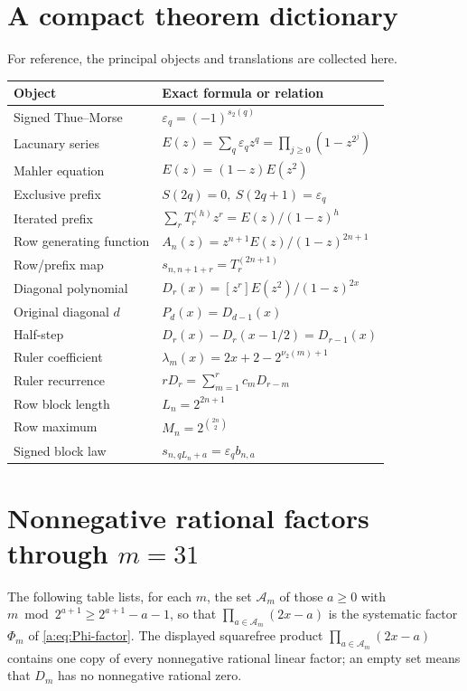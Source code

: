 \documentclass[11pt,a4paper,oneside,openany]{book}
\numberwithin{equation}{chapter}
\theoremstyle{definition}
\theoremstyle{remark}
\newcommand{\eps}{\varepsilon}
\newcommand{\wt}{s_2}
\newcommand{\nuTwo}{\nu_2}
\newcommand{\Diag}{D}
\newcommand{\Prefix}{T}
\begin{document}
\chapter{A compact theorem dictionary}\label{app:dictionary}

For reference, the principal objects and translations are collected here.

\begin{center}
\begin{tabularx}{\textwidth}{@{}p{}X@{}}
\toprule
Object & Exact formula or relation \\
\midrule
Signed Thue--Morse & \(\eps_q=(-1)^{\wt(q)}\) \\
Lacunary series & \(E(z)=\sum_q\eps_qz^q=\prod_{j\ge0}(1-z^{2^j})\) \\
Mahler equation & \(E(z)=(1-z)E(z^2)\) \\
Exclusive prefix & \(S(2q)=0,\ S(2q+1)=\eps_q\) \\
Iterated prefix & \(\sum_r\Prefix_r^{(h)}z^r=E(z)/(1-z)^h\) \\
Row generating function & \(A_n(z)=z^{n+1}E(z)/(1-z)^{2n+1}\) \\
Row/prefix map & \(s_{n,n+1+r}=\Prefix_r^{(2n+1)}\) \\
Diagonal polynomial & \(\Diag_r(x)=[z^r]E(z^2)/(1-z)^{2x}\) \\
Original diagonal \(d\) & \(P_d(x)=\Diag_{d-1}(x)\) \\
Half-step & \(\Diag_r(x)-\Diag_r(x-1/2)=\Diag_{r-1}(x)\) \\
Ruler coefficient & \(\lambda_m(x)=2x+2-2^{\nuTwo(m)+1}\) \\
Ruler recurrence & \(r\Diag_r=\sum_{m=1}^rc_m\Diag_{r-m}\) \\
Row block length & \(L_n=2^{2n+1}\) \\
Row maximum & \(M_n=2^{\binom{2n}{2}}\) \\
Signed block law & \(s_{n,qL_n+a}=\eps_qb_{n,a}\) \\
\bottomrule
\end{tabularx}
\end{center}
\chapter{Nonnegative rational factors through \texorpdfstring{$m=31$}{m=31}}
\label{b:app:factor-table}

The following table lists, for each $m$, the set $\mathcal A_m$ of those $a\ge0$ with $m\bmod 2^{a+1}\ge2^{a+1}-a-1$, so that $\prod_{a\in\mathcal A_m}(2x-a)$ is the systematic factor $\Phi_m$ of \eqref{a:eq:Phi-factor}.  The displayed
squarefree product $\prod_{a\in\mathcal A_m}(2x-a)$ contains one copy of every
nonnegative rational linear factor; an empty set means that $\Diag_m$ has no
nonnegative rational zero.
\end{document}
